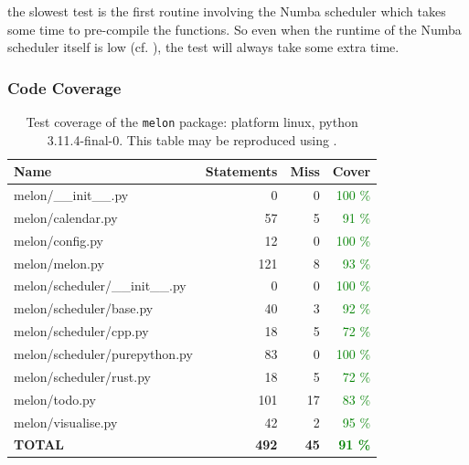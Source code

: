 \documentclass{prettytex/ox/mmsc-special-topic}
\begin{document}
  the slowest test is the first routine involving the Numba scheduler which takes some time to pre-compile the functions.
  So even when the runtime of the Numba scheduler itself is low (cf. ), the test will always take some extra time.

  \subsubsection{Code Coverage}
  \begin{table}[H]
    \centering
    \caption{Test coverage of the \texttt{melon} package: platform linux, python 3.11.4-final-0. This table may be reproduced using .}
    \begin{tabular}{lrrr}
      \hline
      \bf Name                        & \bf Statements & \bf Miss & \bf Cover                    \\
      \hline
      melon/\_\_init\_\_.py           & 0              & 0        & \textcolor{green}{100 \%}    \\
      melon/calendar.py               & 57             & 5        & \textcolor{green}{91 \%}     \\
      melon/config.py                 & 12             & 0        & \textcolor{green}{100 \%}    \\
      melon/melon.py                  & 121            & 8        & \textcolor{green}{93 \%}     \\
      melon/scheduler/\_\_init\_\_.py & 0              & 0        & \textcolor{green}{100 \%}    \\
      melon/scheduler/base.py         & 40             & 3        & \textcolor{green}{92 \%}     \\
      melon/scheduler/cpp.py          & 18             & 5        & \textcolor{green}{72 \%}     \\
      melon/scheduler/purepython.py   & 83             & 0        & \textcolor{green}{100 \%}    \\
      melon/scheduler/rust.py         & 18             & 5        & \textcolor{green}{72 \%}     \\
      melon/todo.py                   & 101            & 17       & \textcolor{green}{83 \%}     \\
      melon/visualise.py              & 42             & 2        & \textcolor{green}{95 \%}     \\
      \hline
      \bf TOTAL                       & \bf 492        & \bf 45   & \bf \textcolor{green}{91 \%}
    \end{tabular}
  \end{table}
\end{document}
